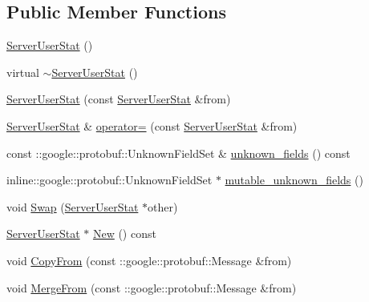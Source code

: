 \subsection*{Public Member Functions}
\begin{DoxyCompactItemize}
\item 
\hyperlink{class_i_m_1_1_base_define_1_1_server_user_stat_a61da4b54965a1066d95c956856a94a03}{Server\+User\+Stat} ()
\item 
virtual \hyperlink{class_i_m_1_1_base_define_1_1_server_user_stat_a73660e82ac1f6f14d410d3c0ea6e5b9a}{$\sim$\+Server\+User\+Stat} ()
\item 
\hyperlink{class_i_m_1_1_base_define_1_1_server_user_stat_abfbfbf0f229d3a9e252dfd56f48a5180}{Server\+User\+Stat} (const \hyperlink{class_i_m_1_1_base_define_1_1_server_user_stat}{Server\+User\+Stat} \&from)
\item 
\hyperlink{class_i_m_1_1_base_define_1_1_server_user_stat}{Server\+User\+Stat} \& \hyperlink{class_i_m_1_1_base_define_1_1_server_user_stat_a95e06f6fb281a1828d60692827adeaa6}{operator=} (const \hyperlink{class_i_m_1_1_base_define_1_1_server_user_stat}{Server\+User\+Stat} \&from)
\item 
const \+::google\+::protobuf\+::\+Unknown\+Field\+Set \& \hyperlink{class_i_m_1_1_base_define_1_1_server_user_stat_a567229385464d19d4cfdd6d8d7b26159}{unknown\+\_\+fields} () const 
\item 
inline\+::google\+::protobuf\+::\+Unknown\+Field\+Set $\ast$ \hyperlink{class_i_m_1_1_base_define_1_1_server_user_stat_aa11176a8ed64aba6a15235bdda01e82c}{mutable\+\_\+unknown\+\_\+fields} ()
\item 
void \hyperlink{class_i_m_1_1_base_define_1_1_server_user_stat_aeb434cec0aeb46f3bb379e948865b10a}{Swap} (\hyperlink{class_i_m_1_1_base_define_1_1_server_user_stat}{Server\+User\+Stat} $\ast$other)
\item 
\hyperlink{class_i_m_1_1_base_define_1_1_server_user_stat}{Server\+User\+Stat} $\ast$ \hyperlink{class_i_m_1_1_base_define_1_1_server_user_stat_a8e5e292435a6b44dc90523d62661f684}{New} () const 
\item 
void \hyperlink{class_i_m_1_1_base_define_1_1_server_user_stat_a6d566a3e846fa2c1ae42e422f16f1baa}{Copy\+From} (const \+::google\+::protobuf\+::\+Message \&from)
\item 
void \hyperlink{class_i_m_1_1_base_define_1_1_server_user_stat_a7b30099c7c7c95fa0d41eb3aa594da8e}{Merge\+From} (const \+::google\+::protobuf\+::\+Message \&from)
\item 

\end{DoxyCompactItemize}
